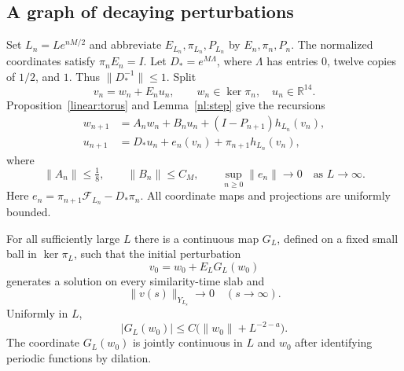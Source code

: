 \subsection{A graph of decaying perturbations}

Set $L_n=Le^{nM/2}$ and abbreviate $E_{L_n},\pi_{L_n},P_{L_n}$ by
$E_n,\pi_n,P_n$. The normalized coordinates satisfy $\pi_nE_n=I$.
Let $D_*=e^{M\Lambda}$, where $\Lambda$ has entries $0$, twelve copies
of $1/2$, and $1$. Thus $\|D_*^{-1}\|\leq1$.
Split
\[
 v_n=w_n+E_nu_n,\qquad w_n\in\ker\pi_n,\quad u_n\in\mathbb R^{14}.
\]
Proposition~\ref{linear:torus} and Lemma~\ref{nl:step} give the recursions
\begin{align}
 w_{n+1}&=A_nw_n+B_nu_n+(I-P_{n+1})h_{L_n}(v_n),\label{nl:forward}\\
 u_{n+1}&=D_*u_n+e_n(v_n)+\pi_{n+1}h_{L_n}(v_n),\label{nl:coordinates}
\end{align}
where
\[
 \|A_n\|\leq\tfrac18,\qquad \|B_n\|\leq C_M,\qquad
 \sup_{n\geq0}\|e_n\|\longrightarrow0\quad\text{as }L\to\infty.
\]
Here $e_n=\pi_{n+1}\mathcal F_{L_n}-D_*\pi_n$. All coordinate maps
and projections are uniformly bounded.

\begin{proposition}\label{nl:graph}
For all sufficiently large $L$ there is a continuous map $G_L$, defined
on a fixed small ball in $\ker\pi_L$, such that the initial perturbation
\[
 v_0=w_0+E_LG_L(w_0)
\]
generates a solution on every similarity-time slab and
\[
 \|v(s)\|_{Y_{L_s}}\longrightarrow0\quad(s\to\infty).
\]
Uniformly in $L$,
\begin{equation}\label{nl:graph-size}
 |G_L(w_0)|\leq C\bigl(\|w_0\|+L^{-2-a}\bigr).
\end{equation}
The coordinate $G_L(w_0)$ is jointly continuous in $L$ and $w_0$ after
identifying periodic functions by dilation.
\end{proposition}


